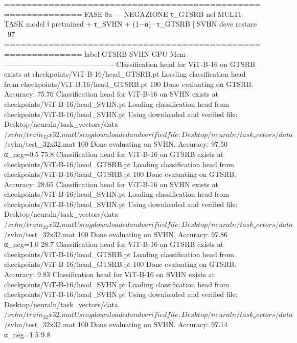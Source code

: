 ============================================================
  FASE 8a — NEGAZIONE τ_GTSRB nel MULTI-TASK model
  ℹ pretrained + τ_SVHN + (1−α)·τ_GTSRB | SVHN deve restare ~97%
============================================================
  label               GTSRB     SVHN    GPU Mem
  ----------------------------------------------
Classification head for ViT-B-16 on GTSRB exists at checkpoints/ViT-B-16/head_GTSRB.pt
Loading classification head from checkpoints/ViT-B-16/head_GTSRB.pt
100%
Done evaluating on GTSRB. Accuracy: 75.76%
Classification head for ViT-B-16 on SVHN exists at checkpoints/ViT-B-16/head_SVHN.pt
Loading classification head from checkpoints/ViT-B-16/head_SVHN.pt
Using downloaded and verified file: Desktop/neuraln/task_vectors/data$/svhn/train_32x32.mat
Using downloaded and verified file: Desktop/neuraln/task_vectors/data$/svhn/test_32x32.mat
100%
Done evaluating on SVHN. Accuracy: 97.50%
  α_neg=0.5           75.8%
Classification head for ViT-B-16 on GTSRB exists at checkpoints/ViT-B-16/head_GTSRB.pt
Loading classification head from checkpoints/ViT-B-16/head_GTSRB.pt
100%
Done evaluating on GTSRB. Accuracy: 28.65%
Classification head for ViT-B-16 on SVHN exists at checkpoints/ViT-B-16/head_SVHN.pt
Loading classification head from checkpoints/ViT-B-16/head_SVHN.pt
Using downloaded and verified file: Desktop/neuraln/task_vectors/data$/svhn/train_32x32.mat
Using downloaded and verified file: Desktop/neuraln/task_vectors/data$/svhn/test_32x32.mat
100%
Done evaluating on SVHN. Accuracy: 97.86%
  α_neg=1.0           28.7%
Classification head for ViT-B-16 on GTSRB exists at checkpoints/ViT-B-16/head_GTSRB.pt
Loading classification head from checkpoints/ViT-B-16/head_GTSRB.pt
100%
Done evaluating on GTSRB. Accuracy: 9.83%
Classification head for ViT-B-16 on SVHN exists at checkpoints/ViT-B-16/head_SVHN.pt
Loading classification head from checkpoints/ViT-B-16/head_SVHN.pt
Using downloaded and verified file: Desktop/neuraln/task_vectors/data$/svhn/train_32x32.mat
Using downloaded and verified file: Desktop/neuraln/task_vectors/data$/svhn/test_32x32.mat
100%
Done evaluating on SVHN. Accuracy: 97.14%
  α_neg=1.5            9.8%

